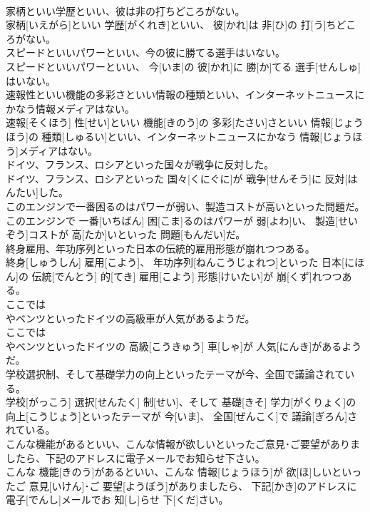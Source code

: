 \documentclass[8pt]{extreport}
\begin{document}
\begin{CJK}{UTF8}{min}
\\	家柄といい学歴といい、彼は非の打ちどころがない。	
\\	家柄[いえがら]といい 学歴[がくれき]といい、 彼[かれ]は 非[ひ]の 打[う]ちどころがない。
\\	スピードといいパワーといい、今の彼に勝てる選手はいない。	
\\	スピードといいパワーといい、 今[いま]の 彼[かれ]に 勝[か]てる 選手[せんしゅ]はいない。
\\	速報性といい機能の多彩さといい情報の種類といい、インターネットニュースにかなう情報メディアはない。	
\\	速報[そくほう] 性[せい]といい 機能[きのう]の 多彩[たさい]さといい 情報[じょうほう]の 種類[しゅるい]といい、インターネットニュースにかなう 情報[じょうほう]メディアはない。
\\	ドイツ、フランス、ロシアといった国々が戦争に反対した。	
\\	ドイツ、フランス、ロシアといった 国々[くにぐに]が 戦争[せんそう]に 反対[はんたい]した。
\\	このエンジンで一番困るのはパワーが弱い、製造コストが高いといった問題だ。	
\\	このエンジンで 一番[いちばん] 困[こま]るのはパワーが 弱[よわ]い、 製造[せいぞう]コストが 高[たか]いといった 問題[もんだい]だ。
\\	終身雇用、年功序列といった日本の伝統的雇用形態が崩れつつある。	
\\	終身[しゅうしん] 雇用[こよう]、 年功序列[ねんこうじょれつ]といった 日本[にほん]の 伝統[でんとう] 的[てき] 雇用[こよう] 形態[けいたい]が 崩[くず]れつつある。
\\	ここでは
\\	やベンツといったドイツの高級車が人気があるようだ。	
\\	ここでは 
\\	やベンツといったドイツの 高級[こうきゅう] 車[しゃ]が 人気[にんき]があるようだ。
\\	学校選択制、そして基礎学力の向上といったテーマが今、全国で議論されている。	
\\	学校[がっこう] 選択[せんたく] 制[せい]、そして 基礎[きそ] 学力[がくりょく]の 向上[こうじょう]といったテーマが 今[いま]、 全国[ぜんこく]で 議論[ぎろん]されている。
\\	こんな機能があるといい、こんな情報が欲しいといったご意見･ご要望がありましたら、下記のアドレスに電子メールでお知らせ下さい。	
\\	こんな 機能[きのう]があるといい、こんな 情報[じょうほう]が 欲[ほ]しいといったご 意見[いけん]･ご 要望[ようぼう]がありましたら、 下記[かき]のアドレスに 電子[でんし]メールでお 知[し]らせ 下[くだ]さい。

\end{CJK}
\end{document}
